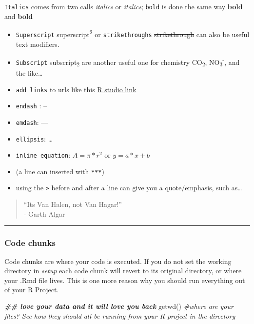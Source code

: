 \documentclass[
]{article}
\newenvironment{Shaded}{\begin{snugshade}}{\end{snugshade}}
\newcommand{\CommentTok}[1]{\textcolor[rgb]{0.56,0.35,0.01}{\textit{#1}}}
\newcommand{\DocumentationTok}[1]{\textcolor[rgb]{0.56,0.35,0.01}{\textbf{\textit{#1}}}}
\newcommand{\FunctionTok}[1]{\textcolor[rgb]{0.00,0.00,0.00}{#1}}
\newcommand{\NormalTok}[1]{#1}
\begin{document}
\texttt{Italics} comes from two calls \emph{italics} or \emph{italics};
\texttt{bold} is done the same way \textbf{bold} and \textbf{bold}

\begin{itemize}
\item
  \texttt{Superscript} superscript\textsuperscript{2} or
  \texttt{strikethroughs} \st{strikethrough} can also be useful text
  modifiers.
\item
  \texttt{Subscript} subscript\textsubscript{2} are another useful one
  for chemistry CO\textsubscript{2},
  NO\textsubscript{3}\textsuperscript{-}, and the like\ldots{}
\item
  \texttt{add\ links} to urls like this \href{www.rstudio.com}{R studio
  link}
\item
  \texttt{endash} : --\\
\item
  \texttt{emdash}: ---\\
\item
  \texttt{ellipsis}: \ldots{}
\item
  \texttt{inline\ equation}: \(A = \pi*r^{2}\) or \(y = a*x+ b\)
\item
  (a line can inserted with \texttt{***})
\item
  using the \texttt{\textgreater{}} before and after a line can give you
  a quote/emphasis, such as\ldots{}
\end{itemize}

\begin{quote}
``Its Van Halen, not Van Hagar!''\\
- Garth Algar
\end{quote}

\begin{center}\rule{0.5\linewidth}{0.5pt}\end{center}

\hypertarget{code-chunks}{%
\subsubsection{Code chunks}\label{code-chunks}}

Code chunks are where your code is executed. If you do not set the
working directory in \emph{setup} each code chunk will revert to its
original directory, or where your .Rmd file lives. This is one more
reason why you should run everything out of your R Project.

\begin{Shaded}
\begin{Highlighting}[]
\DocumentationTok{\#\# love your data and it will love you back}
\FunctionTok{getwd}\NormalTok{() }\CommentTok{\#where are your files? See how they should all be running from your R project in the directory}
\end{Highlighting}
\end{Shaded}
\end{document}
